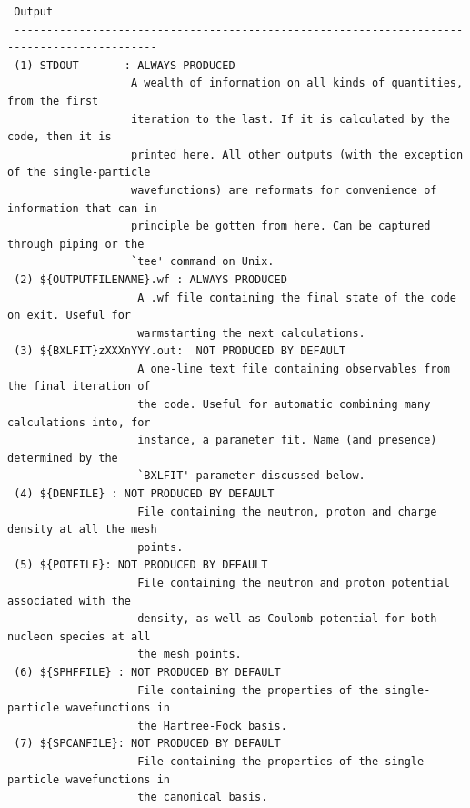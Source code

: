 \documentclass[print,amsmath,amssymb,aps,prc,nofootinbib,notitlepage]{revtex4-1}
\begin{document}
\begin{verbatim}
 Output
 --------------------------------------------------------------------------------------------
 (1) STDOUT       : ALWAYS PRODUCED
                   A wealth of information on all kinds of quantities, from the first 
                   iteration to the last. If it is calculated by the code, then it is 
                   printed here. All other outputs (with the exception of the single-particle 
                   wavefunctions) are reformats for convenience of information that can in 
                   principle be gotten from here. Can be captured through piping or the 
                   `tee' command on Unix.
 (2) ${OUTPUTFILENAME}.wf : ALWAYS PRODUCED
                    A .wf file containing the final state of the code on exit. Useful for 
                    warmstarting the next calculations.
 (3) ${BXLFIT}zXXXnYYY.out:  NOT PRODUCED BY DEFAULT
                    A one-line text file containing observables from the final iteration of
                    the code. Useful for automatic combining many calculations into, for
                    instance, a parameter fit. Name (and presence) determined by the 
                    `BXLFIT' parameter discussed below.
 (4) ${DENFILE} : NOT PRODUCED BY DEFAULT
                    File containing the neutron, proton and charge density at all the mesh
                    points. 
 (5) ${POTFILE}: NOT PRODUCED BY DEFAULT
                    File containing the neutron and proton potential associated with the
                    density, as well as Coulomb potential for both nucleon species at all 
                    the mesh points. 
 (6) ${SPHFFILE} : NOT PRODUCED BY DEFAULT
                    File containing the properties of the single-particle wavefunctions in 
                    the Hartree-Fock basis.
 (7) ${SPCANFILE}: NOT PRODUCED BY DEFAULT
                    File containing the properties of the single-particle wavefunctions in 
                    the canonical basis. 
\end{verbatim}
\clearpage

\end{document}
